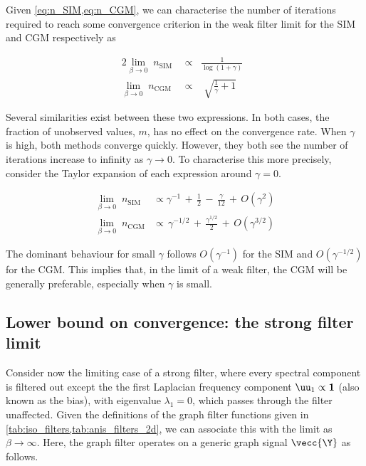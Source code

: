  Given \cref{eq:n_SIM,eq:n_CGM}, we can characterise the number of iterations required to reach some convergence criterion in the weak filter limit for the SIM and CGM respectively as

\begin{alignat}{2}
    \label{eq:n_SIM_WFL}
    \lim_{\beta \rightarrow 0} \;  n_{\text{SIM}} \, & \propto \;\;  \frac{1}{\log(1 + \gamma)} \;\; \\[0.5cm]
    \lim_{\beta \rightarrow 0} \;  n_{\text{CGM}} \, & \propto \;\;\;  \sqrt{\frac{1}{\gamma} + 1} \; 
    \label{eq:n_CGM_WFL}
\end{alignat}

Several similarities exist between these two expressions. In both cases, the fraction of unobserved values, $m$, has no effect on the convergence rate. When $\gamma$ is high, both methods converge quickly. However, they both see the number of iterations increase to infinity as $\gamma \rightarrow 0$. To characterise this more precisely, consider the Taylor expansion of each expression around $\gamma =0$.  


\begin{align}
    \lim_{\beta \rightarrow 0} \;  n_{\text{SIM}}  \;  &\propto \gamma^{-1} \, + \, \frac{1}{2} \, - \, \frac{\gamma}{12} \, + \, O(\gamma^2) \\[0.5cm]
    \lim_{\beta \rightarrow 0} \;  n_{\text{CGM}} &\propto \, \gamma^{-1/2} \, + \, \frac{\gamma^{1/2}}{2} \, + \, O\left(\gamma^{3/2}\right) 
\end{align}

The dominant behaviour for small $\gamma$ follows $O(\gamma^{-1})$ for the SIM and $O(\gamma^{-1/2})$ for the CGM. This implies that, in the limit of a weak filter, the CGM will be generally preferable, especially when $\gamma$ is small.  


\subsection{Lower bound on convergence: the strong filter limit}

Consider now the limiting case of a strong filter, where every spectral component is filtered out except the the first Laplacian frequency component $\uu_1 \propto \mathbf{1}$ (also known as the bias), with eigenvalue $\lambda_1 = 0$, which passes through the filter unaffected. Given the definitions of the graph filter functions given in \cref{tab:iso_filters,tab:anis_filters_2d}, we can associate this with the limit as $\beta \rightarrow \infty$. Here, the graph filter operates on a generic graph signal $\vecc{\Y}$ as follows. 

